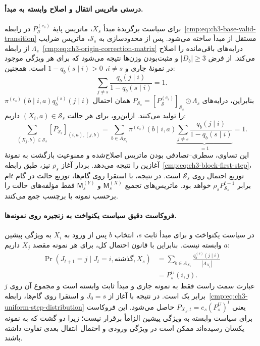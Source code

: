 \paragraph{درستی ماتریس انتقال و اصلاح وابسته به مبدأ.}
برای سیاست برگزیدهٔ مبدأ $X_s$،
ماتریس پایهٔ $P_{\mathcal S}^{(c_s)}$
در رابطه~\eqref{cmp:eq:ch3-base-valid-transition}
مستقل از مبدأ ساخته می‌شود.
پس از محدودسازی به $\mathcal S_s$،
ماتریس ضرایب $\Lambda_s$ از
رابطه~\eqref{cmp:eq:ch3-origin-correction-matrix}
درایه‌های باقی‌مانده را اصلاح می‌کند.
از فرض $|D_b|\ge3$ و مثبت‌بودن
وزن‌ها نتیجه می‌شود که برای هر ویژگی
موجود در نمونهٔ جاری و $i\ne s$،
$1-q_b(s\mid i)>0$ است. همچنین:
\[
\sum_{j\ne s}
\frac{q_b(j\mid i)}{1-q_b(s\mid i)}
=1.
\]
بنابراین، درایه‌های
$P_{\mathcal S_s}
=[P_{\mathcal S}^{(c_s)}]_{\mathcal S_s}
\odot\Lambda_s$
همان احتمال
$\pi^{(c_s)}(b\mid i,a)q_b^{(s)}(j\mid i)$
را تولید می‌کنند. ازاین‌رو، برای هر
حالت $(X_i,a)\in\mathcal S_s$ داریم:
\begin{equation}\label{eq:app-ch3-block-stochastic}
\sum_{(X_j,b)\in\mathcal S_s}
[P_{\mathcal S_s}]_{(i,a),(j,b)}
=\sum_{b\in A_{X_i}}\pi^{(c_s)}(b\mid i,a)
\underbrace{\sum_{j\ne s}
\frac{q_b(j\mid i)}{1-q_b(s\mid i)}}_{=1}
=1.
\end{equation}
این تساوی، سطری--تصادفی بودن
ماتریس اصلاح‌شده و ممنوعیت بازگشت
به نمونهٔ آغازین را نتیجه می‌دهد.
بردار آغاز $\rho_s$ نیز، طبق
رابطه~\eqref{cmp:eq:ch3-block-first-step}،
توزیع احتمال روی $\mathcal S_s$ است.
در نتیجه، با استقرا روی گام‌ها،
توزیع حالت در گام $t$ام برابر
$\rho_sP_{\mathcal S_s}^{t-1}$ خواهد بود.
ماتریس‌های تجمیع $\mathsf M_s^{(X)}$
و $\mathsf M_s^{(Y)}$ فقط مؤلفه‌های
حالت را برحسب نمونه یا برچسب جمع می‌کنند.

\paragraph{فروکاست دقیق سیاست یکنواخت به زنجیره روی نمونه‌ها.}
در سیاست یکنواخت و برای مبدأ ثابت $s$،
انتخاب $b$ پس از ورود به $X_i$ به ویژگی پیشین $a$
وابسته نیست. بنابراین با قانون احتمال کل، برای هر
نمونه مقصد $X_j$ داریم:
\begin{equation}\label{eq:app-ch3-uniform-lumping-proof}
\begin{aligned}
\Pr(J_{t+1}=j\mid J_t=i,\text{گذشته},X_s)
&=\sum_{b\in A_{X_i}}
\frac{q_b^{(s)}(j\mid i)}{|A_{X_i}|}\\
&=P_s^U(i,j).
\end{aligned}
\end{equation}
عبارت سمت راست فقط به نمونه جاری و مبدأ ثابت
وابسته است و مجموع آن روی $j$ برابر یک است.
در نتیجه با آغاز از $J_0=s$ و استقرا روی گام‌ها،
رابطه~\eqref{cmp:eq:ch3-uniform-step-distribution} یعنی
$P_{X_s,t}=e_s(P_s^U)^t$ حاصل می‌شود.
این فروکاست برای سیاست وابسته به ویژگی پیشین
الزاماً برقرار نیست؛ زیرا دو گشت که به
نمونه یکسان رسیده‌اند ممکن است در ویژگی
ورودی و احتمال انتقال بعدی تفاوت داشته باشند.

